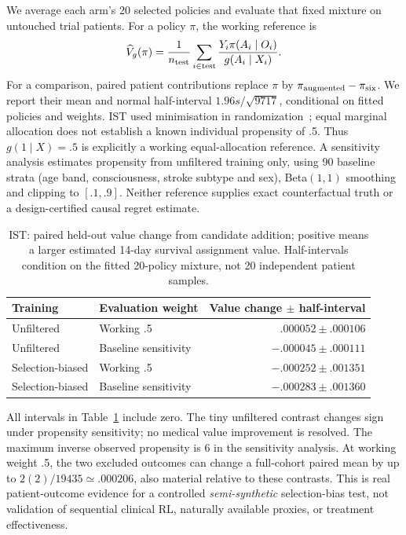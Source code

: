 \documentclass[11pt]{article}
\begin{document}
We average each arm's 20 selected policies and evaluate that fixed mixture
on untouched trial patients. For a policy $\pi$, the working reference is
\[
 \widehat V_g(\pi)=\frac1{n_{\rm test}}\sum_{i\in\rm test}
 \frac{Y_i\pi(A_i\mid O_i)}{g(A_i\mid X_i)}.
\]
For a comparison, paired patient contributions replace $\pi$ by
$\pi_{\rm augmented}-\pi_{\rm six}$. We report their mean and normal
half-interval $1.96s/\sqrt{9717}$, conditional on fitted policies and weights.
IST used minimisation in randomization~\cite{isttrial}; equal marginal
allocation does not establish a known individual propensity of .5.
Thus $g(1\mid X)=.5$ is explicitly a working equal-allocation reference.
A sensitivity analysis estimates propensity from unfiltered training only,
using 90 baseline strata (age band, consciousness, stroke subtype and sex),
Beta$(1,1)$ smoothing and clipping to $[.1,.9]$. Neither reference supplies
exact counterfactual truth or a design-certified causal regret estimate.

\begin{table}[t]\centering\small
\caption{IST: paired held-out value change from candidate addition; positive
means a larger estimated 14-day survival assignment value. Half-intervals
condition on the fitted 20-policy mixture, not 20 independent patient samples.}
\begin{tabular}{llr}\toprule
Training & Evaluation weight & Value change $\pm$ half-interval\\\midrule
Unfiltered & Working .5 & $.000052\pm.000106$\\
Unfiltered & Baseline sensitivity & $-.000045\pm.000111$\\
Selection-biased & Working .5 & $-.000252\pm.001351$\\
Selection-biased & Baseline sensitivity & $-.000283\pm.001360$\\\bottomrule
\end{tabular}\label{tab:ist}
\end{table}

All intervals in Table~\ref{tab:ist} include zero. The tiny unfiltered contrast
changes sign under propensity sensitivity; no medical value improvement is
resolved. The maximum inverse observed propensity is 6 in the sensitivity
analysis. At working weight .5, the two excluded outcomes can change a
full-cohort paired mean by up to $2(2)/19435\simeq.000206$, also material
relative to these contrasts. This is real patient-outcome evidence for a
controlled \emph{semi-synthetic} selection-bias test, not validation of sequential
clinical RL, naturally available proxies, or treatment effectiveness.
\end{document}
